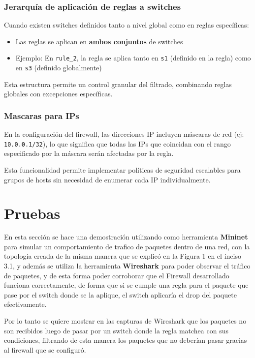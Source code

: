 \subsubsection{Jerarquía de aplicación de reglas  a switches}
Cuando existen switches definidos tanto a nivel global como en reglas específicas:
\begin{itemize}
    \item Las reglas se aplican en \textbf{ambos conjuntos} de switches
    \item Ejemplo: En \texttt{rule\_2}, la regla se aplica tanto en \texttt{s1} (definido en la regla) como en \texttt{s3} (definido globalmente)
\end{itemize}

Esta estructura permite un control granular del filtrado, combinando reglas globales con excepciones específicas.

\subsubsection{Mascaras para IPs}
En la configuración del firewall, las direcciones IP incluyen máscaras de red (ej: \texttt{10.0.0.1/32}), lo que significa que todas las IPs que coincidan con el rango especificado por la máscara serán afectadas por la regla.

Esta funcionalidad permite implementar políticas de seguridad escalables para grupos de hosts sin necesidad de enumerar cada IP individualmente.

\section{Pruebas}

En esta sección se hace una demostración utilizando como herramienta \textbf{Mininet} para simular un comportamiento de trafico de paquetes dentro de una red, con la topología creada de la misma manera que se explicó en la Figura 1 en el inciso 3.1, y además se utiliza la herramienta \textbf{Wireshark} para poder observar el tráfico de paquetes, y de esta forma poder corroborar que el Firewall desarrollado funciona correctamente, de forma que si se cumple una regla para el paquete que pase por el switch donde se la aplique, el switch aplicaría el drop del paquete efectivamente. 

\vspace{0.25 cm}

Por lo tanto se quiere mostrar en las capturas de Wireshark que los paquetes no son recibidos luego de pasar por un switch donde la regla matchea con sus condiciones, filtrando de esta manera los paquetes que no deberían pasar gracias al firewall que se configuró.


